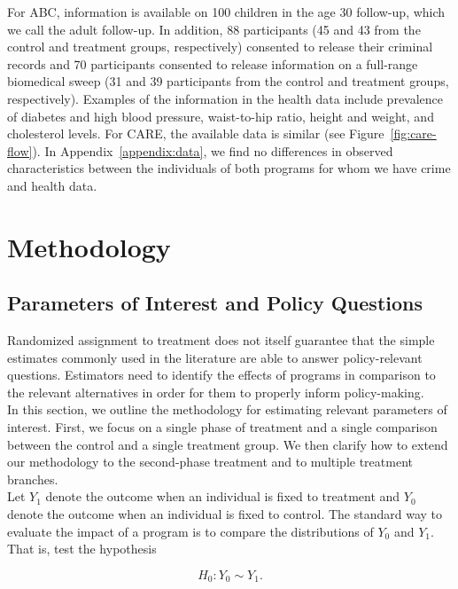\noindent For ABC, information is available on 100 children in the age 30 follow-up, which we call the adult follow-up. In addition, 88 participants (45 and 43 from the control and treatment groups, respectively) consented to release their criminal records and 70 participants consented to release information on a full-range biomedical sweep (31 and 39 participants from the control and treatment groups, respectively). Examples of the information in the health data include prevalence of diabetes and high blood pressure, waist-to-hip ratio, height and weight, and cholesterol levels. For CARE, the available data is similar (see Figure~\ref{fig:care-flow}). In Appendix~\ref{appendix:data}, we find no differences in observed characteristics between the individuals of both programs for whom we have crime and health data.

\section{Methodology} \label{section:methodology}

\subsection{Parameters of Interest and Policy Questions}

\noindent Randomized assignment to treatment does not itself guarantee that the simple estimates commonly used in the literature are able to answer policy-relevant questions. Estimators need to identify the effects of programs in comparison to the relevant alternatives in order for them to properly inform policy-making.\\

\noindent In this section, we outline the methodology for estimating relevant parameters of interest. First, we focus on a single phase of treatment and a single comparison between the control and a single treatment group. We then clarify how to extend our methodology to the second-phase treatment and to multiple treatment branches.\\

\noindent Let $Y_{1}$ denote the outcome when an individual is fixed to treatment and $Y_{0}$ denote the outcome when an individual is fixed to control. The standard way to evaluate the impact of a program is to compare the distributions of $Y_{0}$ and $Y_{1}$. That is, test the hypothesis 

\begin{equation}
H_{0}: Y_{0} \sim Y_{1}. \label{eq:ho}
\end{equation}

